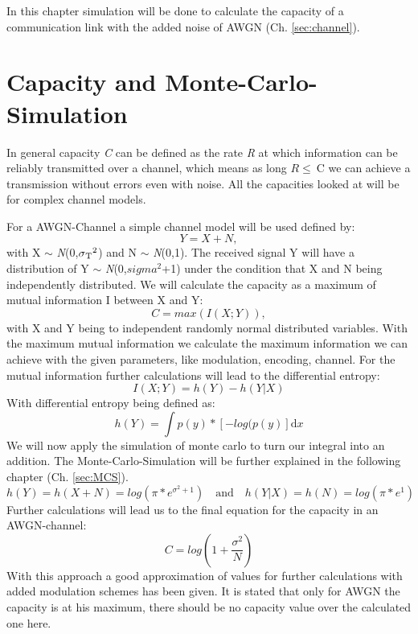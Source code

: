 \documentclass[12pt,oneside, reqno]{report}
\begin{document}
In this chapter simulation will be done to calculate the capacity of a communication link with the added noise of AWGN (Ch. \ref{sec:channel}).

\section{Capacity and Monte-Carlo-Simulation}
\label{sec:capAWGN}

In general capacity \textit{C} can be defined as the rate \textit{R} at which information can be reliably transmitted over a channel, which means as long $R \leq \ $C we can achieve a transmission without errors even with noise. All the capacities looked at will be for complex channel models.

For a \gls{AWGN}-Channel a simple channel model will be used defined by:
\begin{equation}
\label{eq:chanAWGN}
 Y = X + N,   
\end{equation}
with X $\sim$ \textit{N}(0,$\sigma\textsubscript{T}^2$) and N $\sim$ \textit{N}(0,1). The received signal Y will have a distribution of Y $\sim$ \textit{N}(0,$sigma^2$+1) under the condition that X and N being independently distributed.
We will calculate the capacity as a maximum of mutual information I between X and Y:
\begin{equation}
\label{eq:cap}
C = max(I(X;Y)),     
\end{equation}
with X and Y being to independent randomly normal distributed variables.
With the maximum mutual information we calculate the maximum information we can achieve with the given parameters, like modulation, encoding, channel. 
\newline
For the mutual information further calculations will lead to the differential entropy:
\begin{equation}
I(X;Y) = h(Y) - h(Y|X)
\end{equation}
\newline
With differential entropy being defined as:
\begin{equation}
h(Y) = \int p(y)*[-log(p(y)] \mathrm{d}x
\end{equation}
We will now apply the simulation of monte carlo to turn our integral into an addition. The Monte-Carlo-Simulation will be further explained in the following chapter (Ch. \ref{sec:MCS}).
\begin{equation}
h(Y) = h(X+N) = log(\pi*e^{\sigma^2+1}) \quad \textrm{and} \quad h(Y|X) = h(N) = log(\pi*e^{1})
\end{equation}
Further calculations will lead us to the final equation for the capacity in an AWGN-channel:
\begin{equation}
C = log(1+\frac{\sigma^2}{N})
\end{equation}
With this approach a good approximation of values for further calculations with added modulation schemes has been given. It is stated that only for \gls{AWGN} the capacity is at his maximum, there should be no capacity value over the calculated one here. 
\end{document}
